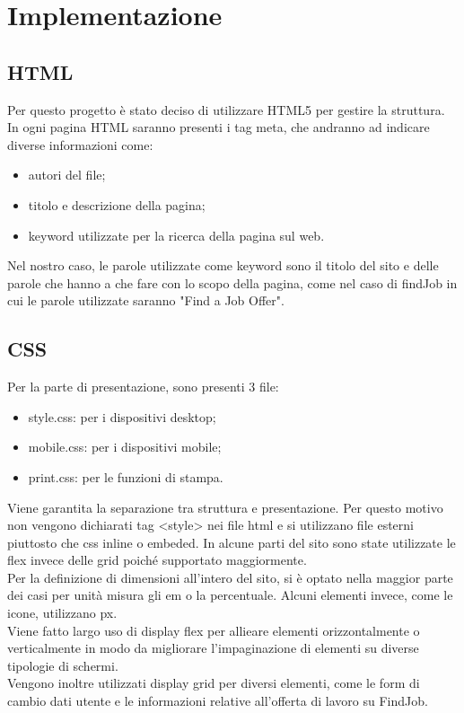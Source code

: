 \section{Implementazione}
	

  \subsection{HTML}
  Per questo progetto è stato deciso di utilizzare HTML5 per gestire la struttura. \\
  In ogni pagina HTML saranno presenti i tag meta, che andranno ad indicare diverse informazioni come:
  \begin{itemize}
    \item autori del file;
    \item titolo e descrizione della pagina;
    \item keyword utilizzate per la ricerca della pagina sul web.
  \end{itemize}
  Nel nostro caso, le parole utilizzate come keyword sono il titolo del sito e delle parole che hanno a che fare con lo scopo della pagina, come nel caso di findJob in cui le parole utilizzate saranno "Find a Job Offer".


  
  \subsection{CSS}
  Per la parte di presentazione, sono presenti 3 file:
  \begin{itemize}
    \item style.css: per i dispositivi desktop;
    \item mobile.css: per i dispositivi mobile;
    \item print.css: per le funzioni di stampa.
  \end{itemize}
  Viene garantita la separazione tra struttura e presentazione. Per questo motivo non vengono dichiarati tag <style> nei file html e si utilizzano file esterni piuttosto che css inline o embeded.
  In alcune parti del sito sono state utilizzate le flex invece delle grid poiché supportato maggiormente.\\
  Per la definizione di dimensioni all'intero del sito, si è optato nella maggior parte dei casi per unità misura gli em o la percentuale. Alcuni elementi invece, come le icone, utilizzano px.\\
  Viene fatto largo uso di display flex per allieare elementi orizzontalmente o verticalmente in modo da migliorare l'impaginazione di elementi su diverse tipologie di schermi. \\
  Vengono inoltre utilizzati display grid per diversi elementi, come le form di cambio dati utente e le informazioni relative all'offerta di lavoro su FindJob.


